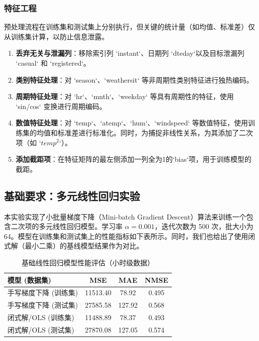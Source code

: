 \documentclass[UTF8,a4paper,10pt]{ctexart}
\begin{document}
\subsubsection{特征工程}
预处理流程在训练集和测试集上分别执行，但关键的统计量（如均值、标准差）仅从训练集计算，以防止信息泄露。
\begin{enumerate}
    \item \textbf{丢弃无关与泄漏列}：移除索引列 `instant`、日期列 `dteday`以及目标泄漏列 `casual` 和 `registered`。
    \item \textbf{类别特征处理}：对 `season`、`weathersit` 等非周期性类别特征进行独热编码。
    \item \textbf{周期特征处理}：对 `hr`、`mnth`、`weekday` 等具有周期性的特征，使用 `sin/cos` 变换进行周期编码。
    \item \textbf{数值特征处理}：对 `temp`、`atemp`、`hum`、`windspeed` 等数值特征，使用训练集的均值和标准差进行标准化。同时，为捕捉非线性关系，为其添加了二次项（如 `$temp^2$`）。
    \item \textbf{添加截距项}：在特征矩阵的最左侧添加一列全为1的`bias`项，用于训练模型的截距。
\end{enumerate}

\subsection{基础要求：多元线性回归实验}
本实验实现了小批量梯度下降（Mini-batch Gradient Descent）算法来训练一个包含二次项的多元线性回归模型。学习率 $\alpha=0.001$，迭代次数为 500 次，批大小为 64。模型在训练集和测试集上的性能指标如下表所示。同时，我们也给出了使用闭式解（最小二乘）的基线模型结果作为对比。

\begin{table}[H]
    \centering
    \caption{基础线性回归模型性能评估（小时级数据）}
    \begin{tabular}{lccc}
        \toprule
        \textbf{模型 (数据集)} & \textbf{MSE} & \textbf{MAE} & \textbf{NMSE} \\
        \midrule
        手写梯度下降 (训练集) & 11513.40 & 78.92 & 0.495 \\
        手写梯度下降 (测试集) & 27585.58 & 127.92 & 0.568 \\
        \midrule
        闭式解/OLS (训练集) & 11488.89 & 78.37 & 0.493 \\
        闭式解/OLS (测试集) & 27870.08 & 127.05 & 0.574 \\
        \bottomrule
    \end{tabular}
\end{table}
\end{document}
